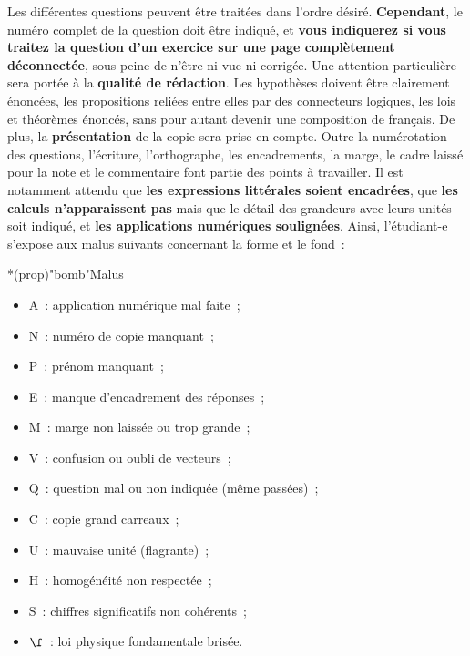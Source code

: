 \documentclass[a4paper, 10pt, garamond, oneside]{book}
\begin{document}
{Les différentes questions peuvent être traitées dans l'ordre désiré.
\textbf{Cependant}, le numéro complet de la question doit être indiqué, et
\textbf{vous indiquerez si vous traitez la question d'un exercice sur une page
	complètement déconnectée}, sous peine de n'être ni vue ni corrigée.
\bigbreak
Une attention particulière sera portée à la \textbf{qualité de rédaction}. Les
hypothèses doivent être clairement énoncées, les propositions reliées entre
elles par des connecteurs logiques, les lois et théorèmes énoncés, sans pour
autant devenir une composition de français.
\bigbreak
De plus, la \textbf{présentation} de la copie sera prise en compte. Outre la
numérotation des questions, l'écriture, l'orthographe, les encadrements, la
marge, le cadre laissé pour la note et le commentaire font partie des points à
travailler. Il est notamment attendu que \textbf{les expressions littérales
	soient encadrées}, que \textbf{les calculs n'apparaissent pas} mais que le
détail des grandeurs avec leurs unités soit indiqué, et \textbf{les applications
	numériques soulignées}.
\bigbreak
Ainsi, l'étudiant-e s'expose aux malus suivants concernant la forme et le fond~:
\begin{tcb}*(prop)"bomb"{Malus}
	\begin{minipage}{0.50\linewidth}
		\begin{itemize}
			\item A~: application numérique mal faite~;
			\item N~: numéro de copie manquant~;
			\item P~: prénom manquant~;
			\item E~: manque d'encadrement des réponses~;
			\item M~: marge non laissée ou trop grande~;
			\item V~: confusion ou oubli de vecteurs~;
		\end{itemize}
	\end{minipage}
	\begin{minipage}{0.50\linewidth}
		\begin{itemize}
			\item Q~: question mal ou non indiquée (même passées)~;
			\item C~: copie grand carreaux~;
			\item U~: mauvaise unité (flagrante)~;
			\item H~: homogénéité non respectée~;
			\item S~: chiffres significatifs non cohérents~;
			\item $\f$~: loi physique fondamentale brisée.
		\end{itemize}
	\end{minipage}
\end{tcb}

}
\end{document}
